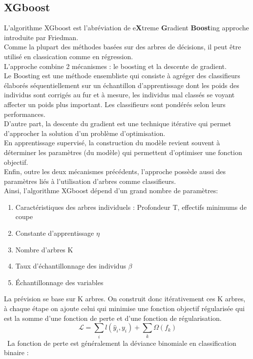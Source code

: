 \documentclass[french]{article}
\begin{document}
\begin{multicols}{2}
\subsection{XGboost}
L’algorithme XGboost est l'abréviation de e\textbf{X}treme \textbf{G}radient \textbf{Boost}ing approche introduite par Friedman.\\
Comme la plupart des méthodes basées sur des arbres de décisions, il peut être utilisé en classication comme en régression.\\
L'approche combine 2 mécanismes : le boosting et la descente de gradient.\\
Le Boosting est une méthode ensembliste qui consiste à agréger des classifieurs élaborés séquentiellement sur un échantillon d’apprentissage dont les poids des individus sont corrigés au fur et à mesure, les individus mal classés se voyant affecter un poids plus important. Les classifieurs sont pondérés selon leurs performances.\\
D'autre part, la descente du gradient est une technique itérative qui permet d’approcher la solution d’un problème d’optimisation.\\
En apprentissage supervisé, la construction du modèle revient souvent à déterminer les paramètres (du modèle) qui permettent d’optimiser une fonction objectif.\\
Enfin, outre les deux mécanismes précédents, l’approche possède aussi des paramètres liés à l’utilisation d’arbres comme classifieurs.\\
Ainsi, l’algorithme XGboost dépend d’un grand nombre de paramètres: 
\begin{enumerate}
    \item Caractéristiques des
arbres individuels : Profondeur T, effectifs minimums de coupe 
\item Constante
d'apprentissage $\eta$
\item Nombre d'arbres K
\item Taux d'échantillonnage des individus $\beta$
\item Échantillonnage des variables
\end{enumerate}
La prévision se base sur K arbres. On construit donc itérativement ces K arbres, à chaque étape on ajoute celui qui minimise une fonction objectif régularisée qui est la somme d'une fonction de perte et d'une fonction de régularisation.\\
\[\ \mathcal{L}=\sum_{i} l\left(\hat{y}_{i}, y_{i}\right)+\sum_{k} \Omega\left(f_{k}\right) \]\
La fonction de perte est généralement la déviance binomiale en classification binaire :\\

\end{multicols}
\end{document}
